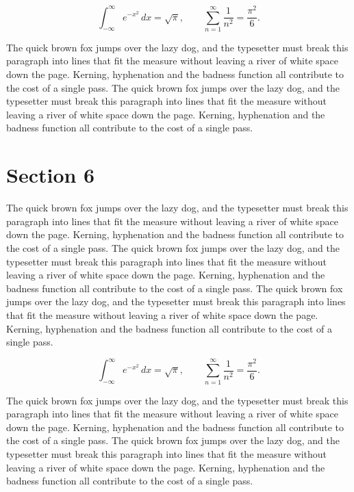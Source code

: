 \documentclass{article}
\begin{document}
\begin{equation}
\int_{-\infty}^{\infty} e^{-x^{2}}\,dx = \sqrt{\pi}, \qquad
\sum_{n=1}^{\infty} \frac{1}{n^{2}} = \frac{\pi^{2}}{6}.
\end{equation}

The quick brown fox jumps over the lazy dog, and the typesetter must break this paragraph into lines that fit the measure without leaving a river of white space down the page. Kerning, hyphenation and the badness function all contribute to the cost of a single pass. The quick brown fox jumps over the lazy dog, and the typesetter must break this paragraph into lines that fit the measure without leaving a river of white space down the page. Kerning, hyphenation and the badness function all contribute to the cost of a single pass. 
\section{Section 6}
The quick brown fox jumps over the lazy dog, and the typesetter must break this paragraph into lines that fit the measure without leaving a river of white space down the page. Kerning, hyphenation and the badness function all contribute to the cost of a single pass. The quick brown fox jumps over the lazy dog, and the typesetter must break this paragraph into lines that fit the measure without leaving a river of white space down the page. Kerning, hyphenation and the badness function all contribute to the cost of a single pass. The quick brown fox jumps over the lazy dog, and the typesetter must break this paragraph into lines that fit the measure without leaving a river of white space down the page. Kerning, hyphenation and the badness function all contribute to the cost of a single pass. 

\begin{equation}
\int_{-\infty}^{\infty} e^{-x^{2}}\,dx = \sqrt{\pi}, \qquad
\sum_{n=1}^{\infty} \frac{1}{n^{2}} = \frac{\pi^{2}}{6}.
\end{equation}

The quick brown fox jumps over the lazy dog, and the typesetter must break this paragraph into lines that fit the measure without leaving a river of white space down the page. Kerning, hyphenation and the badness function all contribute to the cost of a single pass. The quick brown fox jumps over the lazy dog, and the typesetter must break this paragraph into lines that fit the measure without leaving a river of white space down the page. Kerning, hyphenation and the badness function all contribute to the cost of a single pass. 
\end{document}
